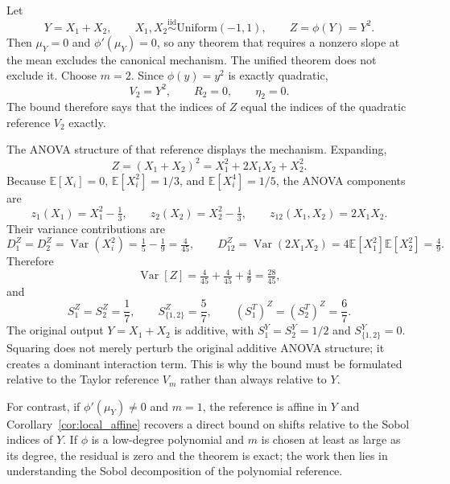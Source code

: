 \documentclass[11pt,letterpaper]{article}
\DeclareMathOperator{\Var}{Var}
\newcommand{\E}{\mathbb{E}}
\theoremstyle{remark}
\begin{document}
Let
\begin{equation}
  Y=X_1+X_2,
  \qquad
  X_1,X_2\overset{\mathrm{iid}}{\sim}\mathrm{Uniform}(-1,1),
  \qquad
  Z=\phi(Y)=Y^2.
\end{equation}
Then $\mu_Y=0$ and $\phi'(\mu_Y)=0$, so any theorem that requires a nonzero
slope at the mean excludes the canonical mechanism. The unified theorem does not
exclude it. Choose $m=2$. Since $\phi(y)=y^2$ is exactly quadratic,
\begin{equation}
  V_2=Y^2,
  \qquad
  R_2=0,
  \qquad
  \eta_2=0.
\end{equation}
The bound therefore says that the indices of $Z$ equal the indices of the
quadratic reference $V_2$ exactly.

The ANOVA structure of that reference displays the mechanism. Expanding,
\begin{equation}
  Z=(X_1+X_2)^2=X_1^2+2X_1X_2+X_2^2.
\end{equation}
Because $\E[X_i]=0$, $\E[X_i^2]=1/3$, and $\E[X_i^4]=1/5$, the ANOVA components
are
\begin{equation}
  z_1(X_1)=X_1^2-\tfrac13,
  \qquad
  z_2(X_2)=X_2^2-\tfrac13,
  \qquad
  z_{12}(X_1,X_2)=2X_1X_2.
\end{equation}
Their variance contributions are
\begin{equation}
  D_1^Z=D_2^Z=\Var(X_i^2)=\tfrac15-\tfrac19=\tfrac4{45},
  \qquad
  D_{12}^Z=\Var(2X_1X_2)=4\E[X_1^2]\E[X_2^2]=\tfrac49.
\end{equation}
Therefore
\begin{equation}
  \Var[Z]=\tfrac4{45}+\tfrac4{45}+\tfrac49=\tfrac{28}{45},
\end{equation}
and
\begin{equation}
  S_1^Z=S_2^Z=\frac{1}{7},
  \qquad
  S_{\{1,2\}}^Z=\frac{5}{7},
  \qquad
  (S_1^T)^Z=(S_2^T)^Z=\frac{6}{7}.
  \label{eq:quadratic_indices}
\end{equation}
The original output $Y=X_1+X_2$ is additive, with $S_1^Y=S_2^Y=1/2$ and
$S_{\{1,2\}}^Y=0$. Squaring does not merely perturb the original additive ANOVA
structure; it creates a dominant interaction term. This is why the bound must be
formulated relative to the Taylor reference $V_m$ rather than always relative to
$Y$.

For contrast, if $\phi'(\mu_Y)\neq0$ and $m=1$, the reference is affine in $Y$
and Corollary~\ref{cor:local_affine} recovers a direct bound on shifts relative
to the Sobol indices of $Y$. If $\phi$ is a low-degree polynomial and $m$ is
chosen at least as large as its degree, the residual is zero and the theorem is
exact; the work then lies in understanding the Sobol decomposition of the
polynomial reference.
\end{document}

